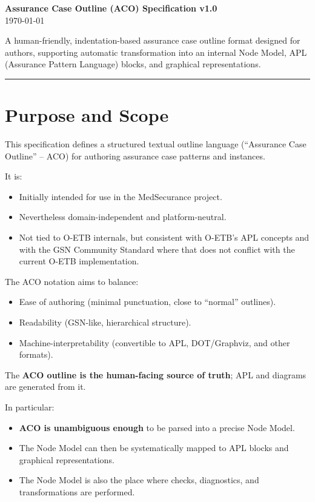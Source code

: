\documentclass[11pt]{article}
\begin{document}
\begin{center}
{\LARGE \textbf{Assurance Case Outline (ACO) Specification v1.0}}\\[0.5em]
\today
\end{center}

A human-friendly, indentation-based assurance case outline format designed for authors, supporting automatic transformation into an internal Node Model, APL (Assurance Pattern Language) blocks, and graphical representations.

\bigskip
\hrule
\bigskip

\section{Purpose and Scope}

This specification defines a structured textual outline language (``Assurance Case Outline'' -- ACO) for authoring assurance case patterns and instances.

It is:
\begin{itemize}[leftmargin=2em]
  \item Initially intended for use in the MedSecurance project.
  \item Nevertheless domain-independent and platform-neutral.
  \item Not tied to O-ETB internals, but consistent with O-ETB's APL concepts and with the GSN Community Standard where that does not conflict with the current O-ETB implementation.
\end{itemize}

The ACO notation aims to balance:
\begin{itemize}[leftmargin=2em]
  \item Ease of authoring (minimal punctuation, close to ``normal'' outlines).
  \item Readability (GSN-like, hierarchical structure).
  \item Machine-interpretability (convertible to APL, DOT/Graphviz, and other formats).
\end{itemize}

The \textbf{ACO outline is the human-facing source of truth}; APL and diagrams are generated from it.

In particular:
\begin{itemize}[leftmargin=2em]
  \item \textbf{ACO is unambiguous enough} to be parsed into a precise Node Model.
  \item The Node Model can then be systematically mapped to APL blocks and graphical representations.
  \item The Node Model is also the place where checks, diagnostics, and transformations are performed.
\end{itemize}
\end{document}
